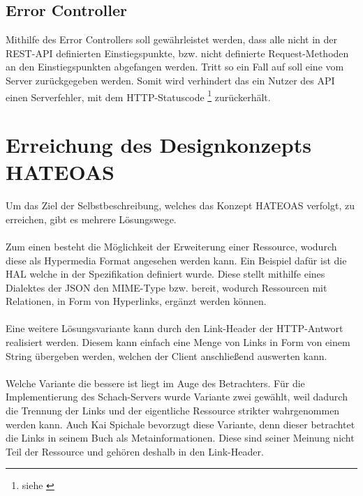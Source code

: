\subsection{Error Controller}\label{sec:errorController}
Mithilfe des Error Controllers soll gewährleistet werden, dass alle nicht in der \gls{REST}-\gls{API} definierten Einstiegspunkte, bzw. nicht definierte Request-Methoden an den Einstiegspunkten abgefangen werden. Tritt so ein Fall auf soll eine  vom Server zurückgegeben werden. Somit wird verhindert das ein Nutzer des \gls{API} einen Serverfehler, mit dem HTTP-Statuscode \footnote{siehe \cite[A.2.5]{kretzschmar}} zurückerhält.

\section{Erreichung des Designkonzepts HATEOAS}\label{sec:konzeptHATEOAS}
Um das Ziel der Selbstbeschreibung, welches das Konzept HATEOAS verfolgt, zu erreichen, gibt es mehrere Lösungswege.\\
\\
Zum einen besteht die Möglichkeit der Erweiterung einer Ressource, wodurch diese als Hypermedia Format angesehen werden kann. Ein Beispiel dafür ist die \gls{HAL} welche in der Spezifikation \cite{halSpezification} definiert wurde. Diese stellt mithilfe eines Dialektes der \gls{JSON} den \gls{MIME}-Type  bzw.  bereit, wodurch Ressourcen mit Relationen, in Form von Hyperlinks, ergänzt werden können.\\
\\
Eine weitere Lösungsvariante kann durch den Link-Header der \gls{HTTP}-Antwort realisiert werden. Diesem kann einfach eine Menge von Links in Form von einem String übergeben werden, welchen der Client anschließend auswerten kann.\\
\\
Welche Variante die bessere ist liegt im Auge des Betrachters. Für die Implementierung des Schach-Servers wurde Variante zwei gewählt, weil dadurch die Trennung der Links und der eigentliche Ressource strikter wahrgenommen werden kann. Auch Kai Spichale bevorzugt diese Variante, denn dieser betrachtet die Links in seinem Buch \cite{apiDesign} als Metainformationen. Diese sind seiner Meinung nicht Teil der Ressource und gehören deshalb in den Link-Header.